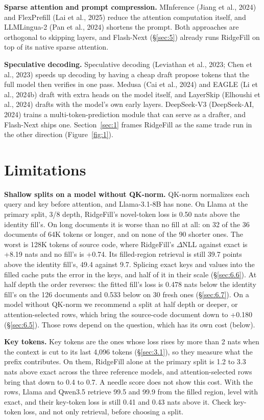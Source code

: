 \documentclass[11pt]{article}
\begin{document}
\textbf{Sparse attention and prompt compression.} MInference (Jiang et al., 2024) and FlexPrefill (Lai et al., 2025) reduce the attention computation itself, and LLMLingua-2 (Pan et al., 2024) shortens the prompt. Both approaches are orthogonal to skipping layers, and Flash-Next (\S\ref{sec:5}) already runs RidgeFill on top of its native sparse attention.

\textbf{Speculative decoding.} Speculative decoding (Leviathan et al., 2023; Chen et al., 2023) speeds up decoding by having a cheap draft propose tokens that the full model then verifies in one pass. Medusa (Cai et al., 2024) and EAGLE (Li et al., 2024b) draft with extra heads on the model itself, and LayerSkip (Elhoushi et al., 2024) drafts with the model's own early layers. DeepSeek-V3 (DeepSeek-AI, 2024) trains a multi-token-prediction module that can serve as a drafter, and Flash-Next ships one. Section~\ref{sec:1} frames RidgeFill as the same trade run in the other direction (Figure~\ref{fig:1}).


\section{Limitations}\label{sec:8}
\textbf{Shallow splits on a model without QK-norm.} QK-norm normalizes each query and key before attention, and Llama-3.1-8B has none. On Llama at the primary split, 3/8 depth, RidgeFill's novel-token loss is 0.50 nats above the identity fill's. On long documents it is worse than no fill at all: on 32 of the 36 documents of 64K tokens or longer, and on none of the 90 shorter ones. The worst is 128K tokens of source code, where RidgeFill's $\Delta$NLL against exact is +8.19 nats and no fill's is +0.74. Its filled-region retrieval is still 39.7 points above the identity fill's, 49.4 against 9.7. Splicing exact keys and values into the filled cache puts the error in the keys, and half of it in their scale (\S\ref{sec:6.6}). At half depth the order reverses: the fitted fill's loss is 0.478 nats below the identity fill's on the 126 documents and 0.533 below on 30 fresh ones (\S\ref{sec:6.7}). On a model without QK-norm we recommend a split at half depth or deeper, or attention-selected rows, which bring the source-code document down to +0.180 (\S\ref{sec:6.5}). Those rows depend on the question, which has its own cost (below).

\textbf{Key tokens.} Key tokens are the ones whose loss rises by more than 2 nats when the context is cut to its last 4,096 tokens (\S\ref{sec:3.1}), so they measure what the prefix contributes. On them, RidgeFill alone at the primary split is 1.2 to 3.3 nats above exact across the three reference models, and attention-selected rows bring that down to 0.4 to 0.7. A needle score does not show this cost. With the rows, Llama and Qwen3.5 retrieve 99.5 and 99.9 from the filled region, level with exact, and their key-token loss is still 0.41 and 0.43 nats above it. Check key-token loss, and not only retrieval, before choosing a split.
\end{document}
